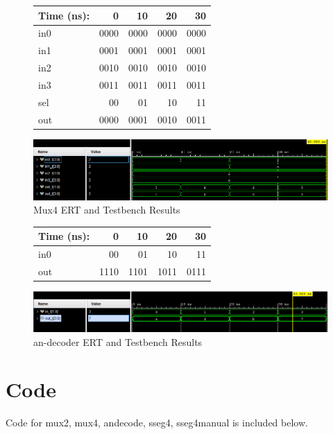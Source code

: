 \documentclass[11pt]{article}
\begin{document}
\begin{figure}[ht]\centering
	\begin{tabular}{l|rrrr}
		Time (ns): & 0 & 10 & 20 & 30 \\
		\midrule
		in0 & 0000 & 0000 & 0000 & 0000 \\
		in1 & 0001 & 0001 & 0001 & 0001 \\
		in2 & 0010 & 0010 & 0010 & 0010 \\
		in3 & 0011 & 0011 & 0011 & 0011 \\
		sel & 00 & 01 & 10 & 11 \\
		\midrule
		out & 0000 & 0001 & 0010 & 0011 \\
		\bottomrule
	\end{tabular}\medskip
	
	\includegraphics[width=1.1\textwidth]{mux4sim.png}
	\caption{Mux4 ERT and Testbench Results}
	\label{fig:sim_with_table}
\end{figure}

\begin{figure}[ht]\centering
	\begin{tabular}{l|rrrr}
		Time (ns): & 0 & 10 & 20 & 30 \\
		\midrule
		in0 & 00 & 01 & 10 & 11 \\
		\midrule
		out & 1110 & 1101 & 1011 & 0111 \\
		\bottomrule
	\end{tabular}\medskip

	\includegraphics[width=1.1\textwidth]{an_decodesim.png}
	\caption{an-decoder ERT and Testbench Results}
	\label{fig:sim_with_table}
\end{figure}

\section*{Code}

Code for mux2, mux4, andecode, sseg4, sseg4manual is included below.
\end{document}
